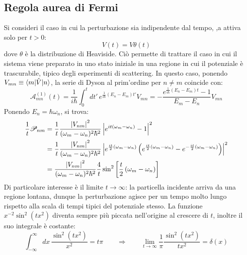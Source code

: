 \subsection{Regola aurea di Fermi}

Si consideri il caso in cui la perturbazione sia indipendente dal tempo, ,a attiva solo per $ t > 0 $:
\begin{equation}
	V(t) = V \theta(t)
	\label{eq:5.24}
\end{equation}
dove $ \theta $ è la distribuzione di Heaviside. Ciò permette di trattare il caso in cui il sistema viene preparato in uno stato iniziale in una regione in cui il potenziale è trascurabile, tipico degli esperimenti di scattering. In questo caso, ponendo $ V_{mn} \equiv \braket{m | \hat{V} | n} $, la serie di Dyson al prim'ordine per $ n \neq m $ coincide con:
\begin{equation*}
	\mathscr{A}^{(1)}_{mn}(t) = \frac{1}{i\hbar} \int_0^t dt'\, e^{\frac{1}{i\hbar} \left( E_n - E_m \right) t'} V_{mn} = - \frac{e^{\frac{1}{i\hbar} \left( E_n - E_m \right) t} - 1}{E_m - E_n} V_{mn}
\end{equation*}
Ponendo $ E_n = \hbar \omega_n $, si trova:
\begin{equation*}
	\begin{split}
		\frac{1}{t} \mathscr{P}_{nm}
		&= \frac{1}{t} \frac{\left\lvert V_{nm}\right\rvert^2}{(\omega_m - \omega_n)^2 \hbar^2} \left\lvert e^{it \left( \omega_m - \omega_n \right)} - 1\right\rvert^2 \\
		&= \frac{1}{t} \frac{\left\lvert V_{nm}\right\rvert^2}{(\omega_m - \omega_n)^2 \hbar^2} \left\lvert e^{\frac{it}{2} \left( \omega_m - \omega_n \right)} \left( e^{\frac{it}{2} \left( \omega_m - \omega_n \right)} - e^{-\frac{it}{2} \left( \omega_m - \omega_n \right)} \right)\right\rvert^2 \\
		&= \frac{\left\lvert V_{nm}\right\rvert^2}{(\omega_m - \omega_n)^2 \hbar^2} \frac{4}{t} \sin^2 \left[ \frac{t}{2} \left( \omega_m - \omega_n \right) \right]
	\end{split}
\end{equation*}
Di particolare interesse è il limite $ t \rightarrow \infty $: la particella incidente arriva da una regione lontana, dunque la perturbazione agisce per un tempo molto lungo rispetto alla scala di tempi tipici del potenziale stesso. La funzione $ x^{-2} \sin^2 (tx^2) $ diventa sempre più piccata nell'origine al crescere di $ t $, inoltre il suo integrale è costante:
\begin{equation*}
	\int_{-\infty}^{\infty} dx\, \frac{\sin^2 (tx^2)}{x^2} = t\pi
	\qquad \Rightarrow \qquad
	\lim_{t \rightarrow \infty} \frac{1}{\pi} \frac{\sin^2 (tx^2)}{tx^2} = \delta(x)
\end{equation*}
